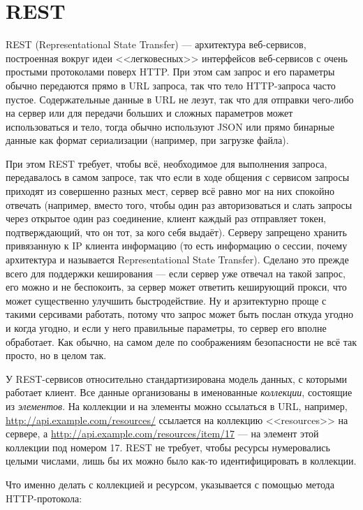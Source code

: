 \documentclass{../../text-style}
\begin{document}
\section{REST}

REST (Representational State Transfer) --- архитектура веб-сервисов, построенная вокруг идеи <<легковесных>> интерфейсов веб-сервисов с очень простыми протоколами поверх HTTP. При этом сам запрос и его параметры обычно передаются прямо в URL запроса, так что тело HTTP-запроса часто пустое. Содержательные данные в URL не лезут, так что для отправки чего-либо на сервер или для передачи больших и сложных параметров может использоваться и тело, тогда обычно используют JSON или прямо бинарные данные как формат сериализации (например, при загрузке файла).

При этом REST требует, чтобы всё, необходимое для выполнения запроса, передавалось в самом запросе, так что если в ходе общения с сервисом запросы приходят из совершенно разных мест, сервер всё равно мог на них спокойно отвечать (например, вместо того, чтобы один раз авторизоваться и слать запросы через открытое один раз соединение, клиент каждый раз отправляет токен, подтверждающий, что он тот, за кого себя выдаёт). Серверу запрещено хранить привязанную к IP клиента информацию (то есть информацию о сессии, почему архитектура и называется Representational State Transfer). Сделано это прежде всего для поддержки кеширования --- если сервер уже отвечал на такой запрос, его можно и не беспокоить, за сервер может ответить кеширующий прокси, что может существенно улучшить быстродействие. Ну и арзитектурно проще с такими серсивами работать, потому что запрос может быть послан откуда угодно и когда угодно, и если у него правильные параметры, то сервер его вполне обработает. Как обычно, на самом деле по соображениям безопасности не всё так просто, но в целом так.

У REST-сервисов относительно стандартизирована модель данных, с которыми работает клиент. Все данные организованы в именованные \textit{коллекции}, состоящие из \textit{элементов}. На коллекции и на элементы можно ссылаться в URL, например, \url{http://api.example.com/resources/} ссылается на коллекцию <<resources>> на сервере, а \url{http://api.example.com/resources/item/17} --- на элемент этой коллекции под номером 17. REST не требует, чтобы ресурсы нумеровались целыми числами, лишь бы их можно было как-то идентифицировать в коллекции.

Что именно делать с коллекцией и ресурсом, указывается с помощью метода HTTP-протокола:
\end{document}
